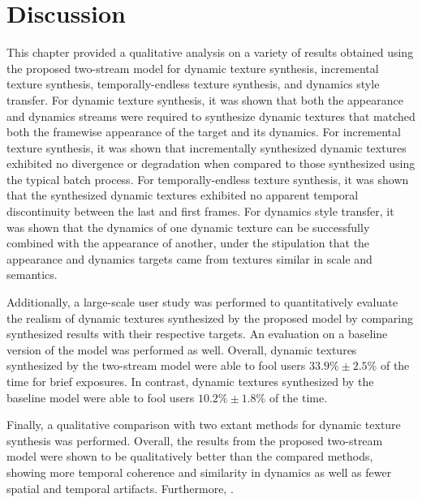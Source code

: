 \section{Discussion}

This chapter provided a qualitative analysis on a variety of results obtained using the proposed two-stream model for dynamic texture synthesis, incremental texture synthesis, temporally-endless texture synthesis, and dynamics style transfer. For dynamic texture synthesis, it was shown that both the appearance and dynamics streams were required to synthesize dynamic textures that matched both the framewise appearance of the target and its dynamics. For incremental texture synthesis, it was shown that incrementally synthesized dynamic textures exhibited no divergence or degradation when compared to those synthesized using the typical batch process. For temporally-endless texture synthesis, it was shown that the synthesized dynamic textures exhibited no apparent temporal discontinuity between the last and first frames. For dynamics style transfer, it was shown that the dynamics of one dynamic texture can be successfully combined with the appearance of another, under the stipulation that the appearance and dynamics targets came from textures similar in scale and semantics.

Additionally, a large-scale user study was performed to quantitatively evaluate the realism of dynamic textures synthesized by the proposed model by comparing synthesized results with their respective targets. An evaluation on a baseline version of the model was performed as well. Overall, dynamic textures synthesized by the two-stream model were able to fool users $33.9\% \pm 2.5\%$ of the time for brief exposures. In contrast, dynamic textures synthesized by the baseline model were able to fool users $10.2\% \pm 1.8\%$ of the time. 

Finally, a qualitative comparison with two extant methods for dynamic texture synthesis was performed. Overall, the results from the proposed two-stream model were shown to be qualitatively better than the compared methods, showing more temporal coherence and similarity in dynamics as well as fewer spatial and temporal artifacts. Furthermore, .
